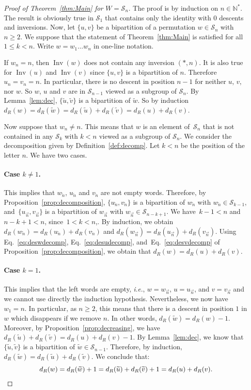 \documentclass[ALCO,Unicode]{cedram}
\theoremstyle{definition}
\newcommand{\Sym}[1]{\mathcal{S}_{#1}}
\newcommand{\Symn}{\Sym{n}}
\DeclareMathOperator{\invs}{Inv}
\newcommand{\dec}[1]{\widetilde{#1}}
\newcommand{\R}{{\overrightarrow{n}}}
\newcommand{\LL}{{\overleftarrow{n}}}
\newcommand{\dd}{d_R}
\begin{document}
\begin{proof}[Proof of Theorem~\ref{thm:Main} for $W=\mathcal S_n$] The proof is  by induction on $n\in\mathbb N^*$. The result is obviously true in $\Sym{1}$ that contains only the identity with 0 descents and inversions. Now, let $\lbrace u, v \rbrace$ be a bipartition of a permutation $w \in \Symn$ with $n \geq 2$. We suppose that the statement of  Theorem~\ref{thm:Main} is satisfied for all $1 \leq k < n$. Write $w=w_1\dots w_n$ in one-line notation. 

If $w_n = n$, then $\invs(w)$ does not contain any inversion $(*, n)$. It is also true for $\invs(u)$ and $\invs(v)$ since $\{u,v\}$ is a bipartition of $n$. Therefore $u_n = v_n =n$. In particular, there is no descent in position $n-1$ for neither $u$, $v$, nor $w$. So $w$, $u$ and $v$ are in $\mathcal S_{n-1}$ viewed as a subgroup of $\Symn$.  By Lemma~\ref{lem:dec}, $\lbrace \dec{u}, \dec{v} \rbrace$ is a bipartition of $\dec{w}$. So by induction $\dd(w) = \dd(\dec{w}) = \dd(\dec{u}) + \dd(\dec{v}) = \dd(u) + \dd(v)$.

Now suppose that $w_n \neq n$. This means that $w$ is an element of~$\Symn$ that is not contained in any $\Sym{k}$ with $k < n$ viewed as a subgroup of $\Symn$. We consider the decomposition given by Definition~\ref{def:decomp}. Let $k<n$ be the position of the letter $n$. We have two cases.

\paragraph{Case $k \neq 1$.} This implies that $w_\LL$, $u_\LL$ and $v_\LL$ are not empty words. Therefore, by Proposition~\ref{prop:decomposition}, $\lbrace u_\LL, v_\LL \rbrace$ is a bipartition of $w_\LL$ with $w_\LL \in \Sym{k-1}$, and~$\lbrace u_\R, v_\R \rbrace$ is a bipartition of $w_\R$ with $w_\R \in \Sym{n-k+1}$. We have~$k-1 < n$ and  $n-k+1 <n$, since~$1<k < n$,. By induction, we obtain $\dd(w_\LL) = \dd(u_\LL) + \dd(v_\LL)$ and $\dd(w_\R) = \dd(u_\R) + \dd(v_\R)$. Using Eq.~\eqref{eq:deswdecomp}, Eq.~\eqref{eq:desudecomp}, and~Eq.~\eqref{eq:desvdecomp} of Proposition~\ref{prop:decomposition}, we obtain that $\dd(w) = \dd(u) + \dd(v)$.

\paragraph{Case $k=1$.} This implies that the left words are empty, \emph{i.e.}, $w = w_\R$, $u= u_\R$, and $v = v_\R$ and we cannot use directly the induction hypothesis. Nevertheless, we now have $w_1 = n$. In particular, as $n \geq 2$, this means that there is a descent in position $1$ in $w$ which disappears if we remove $n$. In other words, $\dd(\dec{w}) = \dd(w) - 1$.  Moreover, by Proposition~\ref{prop:decreasing}, we have $\dd(\dec{u}) + \dd(\dec{v}) = \dd(u) + \dd(v) -1$. By Lemma~\ref{lem:dec}, we know that $\lbrace \dec{u}, \dec{v} \rbrace$ is a bipartition of $\dec{w}\in\mathcal S_{n-1}$. Therefore, by induction,  $\dd(\dec{w}) = \dd(\dec{u}) + \dd(\dec{v})$. We conclude that:
\[\dd(w)=\dd(\dec{w}) +1=\dd(\dec{u}) + \dd(\dec{v}) +1= \dd(u) + \dd(v). \qedhere\]
\end{proof}
\end{document}
